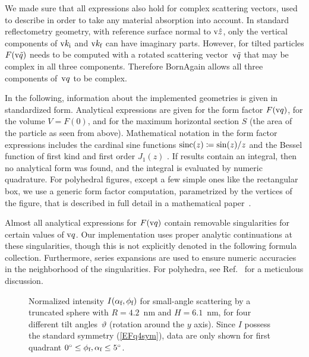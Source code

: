 We made sure that all expressions also hold for complex scattering vectors,
used to describe in order to take any material absorption into account.
In standard reflectometry geometry, with reference surface normal to $\v{\hat z}$,
only the vertical components of $\k_\si$ and $\k_\sf$ can have imaginary parts.
However,
for tilted particles
$F(\v{\tilde{q}})$ needs to be computed with
a rotated scattering vector~$\v{\tilde q}$
that may be complex in all three components.
Therefore BornAgain allows all three components of~$\q$ to be complex.

In the following,
information about the implemented geometries is given in standardized form.
Analytical expressions are given for the form factor $F(\q)$,
for the volume $V=F(0)$,
%
and for the maximum horizontal section $S$
(the area of the particle as seen from above).
Mathematical notation in the form factor expressions includes
the cardinal sine functions $\sinc(z)\coloneqq\sin(z)/z$
%
and the Bessel function of first kind and first order $J_1(z)$
%
%
\cite[Ch.~9]{AbSt64}.
If results contain an integral,
then no analytical form was found,
and the integral is evaluated by numeric quadrature.
%
For polyhedral figures,
%
except a few simple ones like the rectangular box,
we use a generic form factor computation,
parametrized by the vertices of the figure,
that is described in full detail in a mathematical paper~\cite{Wut17}.

Almost all analytical expressions for $F(\q)$ contain
removable singularities for certain values of $\q$.
Our implementation uses proper analytic continuations at these singularities,
%
though this is not explicitly denoted in the following formula collection.
Furthermore, series expansions are used to ensure numeric accuracies
in the neighborhood of the singularities.
For polyhedra, see Ref.~\cite{Wut17} for a meticulous discussion.

\begin{figure}[t]
\begin{center}
\end{center}
\caption{Normalized intensity $I(\alpha_\sf,\phi_\sf)$
for small-angle scattering by a truncated sphere with $R=4.2$~nm and $H=6.1$~nm,
for four different tilt angles~$\vartheta$ (rotation around the $y$ axis).
Since $I$ possess the standard symmetry (\protect\ref{EFq4sym}),
data are only shown for first quadrant $0^\circ\le\phi_\sf,\alpha_\sf\le 5^\circ$.}
\label{F1quadrants}
\end{figure}

